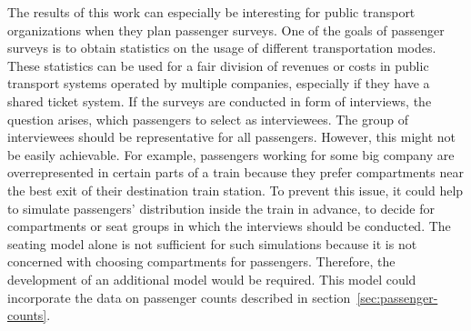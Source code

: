 The results of this work can especially be interesting for public transport
organizations when they plan passenger surveys.
One of the goals of passenger surveys is to obtain statistics on the usage of
different transportation modes.
These statistics can be used for a fair division of revenues or costs in public
transport systems operated by multiple companies, especially if they have a
shared ticket system.
If the surveys are conducted in form of interviews, the question arises, which
passengers to select as interviewees.
The group of interviewees should be representative for all passengers.
However, this might not be easily achievable.
For example, passengers working for some big company are overrepresented in
certain parts of a train because they prefer compartments near the best exit of
their destination train station.
To prevent this issue, it could help to simulate passengers' distribution inside
the train in advance, to decide for compartments or seat groups in which the
interviews should be conducted.
The seating model alone is not sufficient for such simulations because it is not
concerned with choosing compartments for passengers.
Therefore, the development of an additional model would be required.
This model could incorporate the data on passenger counts described in
section~\ref{sec:passenger-counts}.



